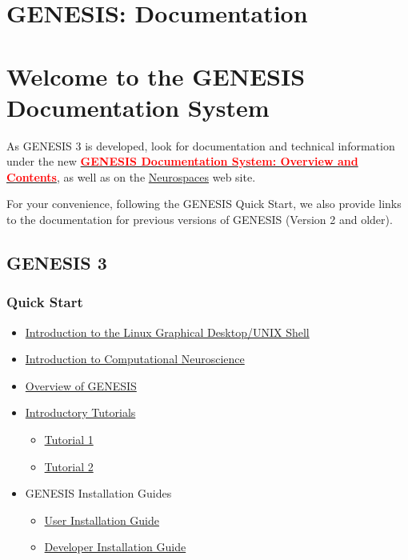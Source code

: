 \documentclass[12pt]{article}
\begin{document}
\section*{GENESIS: Documentation}

\section*{Welcome to the GENESIS Documentation System}

As GENESIS 3 is developed, look for documentation and technical information under the new \href{../documentation-overview/documentation-overview.tex}{\textcolor{red}{\bf GENESIS Documentation System: Overview and Contents}}, as well as on the \href{http://www.neurospaces.org}{Neurospaces} web site.

For your convenience, following the GENESIS Quick Start, we also provide links to the documentation for previous versions of GENESIS (Version 2 and older).

\subsection*{GENESIS 3}

\subsubsection*{Quick Start}

\begin{itemize}

   \item \href{../unix-linux/unix-linux.tex}{Introduction to the Linux Graphical Desktop/UNIX Shell}

   \item \href{../compneurosci-1/compneurosci-1.tex}{Introduction to Computational Neuroscience}

   \item \href{../genesis-overview/genesis-overview.tex}{Overview of GENESIS}

   \item \href{../contents-level1/contents-level1.tex}{Introductory Tutorials}
     \begin{itemize}
        \item \href{../tutorial1/tutorial1.tex}{Tutorial 1}
       \item \href{../tutorial2/tutorial2.tex}{Tutorial 2}
     \end{itemize}

   \item GENESIS Installation Guides
      \begin{itemize}
         \item \href{../installation-user/installation-user.tex}{User Installation Guide}
         \item \href{../installation-developer/installation-developer.tex}{Developer Installation Guide}
      \end{itemize}

\end{itemize}
\end{document}
